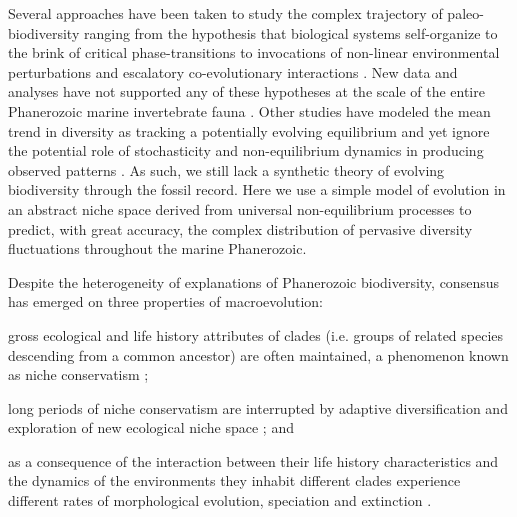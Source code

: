 Several approaches have been taken to study the complex trajectory of
paleo-biodiversity ranging from the hypothesis that biological systems
self-organize to the brink of critical phase-transitions
\citep{bak1993, sole1997} to invocations of non-linear environmental
perturbations \citep{newman1995} and escalatory co-evolutionary
interactions \citep{vermeij1987}. New data and analyses have not
supported any of these hypotheses at the scale of the entire
Phanerozoic marine invertebrate fauna \citep{kirchner1998, madin2006,
  alroy08}. Other studies have modeled the mean trend in diversity as
tracking a potentially evolving equilibrium \citep{sepkoski1984,
  alroy08, alroy2010, rabosky2009ecolLett} and yet ignore the
potential role of stochasticity and non-equilibrium dynamics in
producing observed patterns \citep{erwin2012, liow2007,
  quental2013}. As such, we still lack a synthetic theory of evolving
biodiversity through the fossil record.
%
Here we use a simple model of evolution in an abstract niche space
derived from universal non-equilibrium processes to predict,
with great accuracy, the complex distribution of pervasive diversity
fluctuations throughout the marine Phanerozoic.

Despite the heterogeneity of explanations of Phanerozoic
biodiversity, consensus has emerged on three properties of
macroevolution:
\begin{inparaenum}
\item gross ecological and life history attributes of clades
  (i.e. groups of related species descending from a common ancestor)
  are often maintained, a phenomenon known as niche conservatism
  \citep{roy2009range, hopkins2014};
\item long periods of niche conservatism are interrupted by adaptive
  diversification and exploration of new ecological niche space
  \citep{eldredgeGould1972, newman1985adaptive, hopkins2014}; and
\item as a consequence of the interaction between their life history
  characteristics and the dynamics of the environments they inhabit
  \citep{vrba1983} different clades experience different rates of
  morphological evolution, speciation and extinction
  \citep{simpson1953, sepkoski1984, holman1989, gilinsky1994}.
\end{inparaenum}

